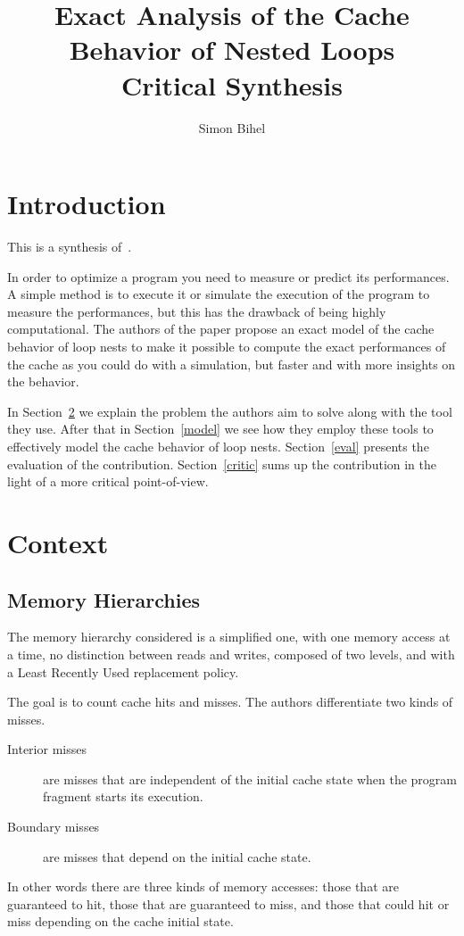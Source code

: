\documentclass{article}
\title{Exact Analysis of the Cache Behavior of Nested Loops\\
        \large Critical Synthesis}
\author{Simon Bihel}
\begin{document}
\maketitle

\section{Introduction}
This is a synthesis of~\cite{chatterjee2001exact}.

In order to optimize a program you need to measure or predict its performances.
A simple method is to execute it or simulate the execution of the program to measure the performances, but this has the drawback of being highly computational.
The authors of the paper propose an exact model of the cache behavior of loop nests to make it possible to compute the exact performances of the cache as you could do with a simulation, but faster and with more insights on the behavior.

In Section~\ref{context} we explain the problem the authors aim to solve along with the tool they use.
After that in Section~\ref{model} we see how they employ these tools to effectively model the cache behavior of loop nests.
Section~\ref{eval} presents the evaluation of the contribution.
Section~\ref{critic} sums up the contribution in the light of a more critical point-of-view.

\section{Context}
\label{context}

\subsection{Memory Hierarchies}
The memory hierarchy considered is a simplified one, with one memory access at a time, no distinction between reads and writes, composed of two levels, and with a Least Recently Used replacement policy.

The goal is to count cache hits and misses.
The authors differentiate two kinds of misses.
\begin{description}
        \item[Interior misses] are misses that are independent of the initial cache state when the program fragment starts its execution.
        \item[Boundary misses] are misses that depend on the initial cache state.
\end{description}
In other words there are three kinds of memory accesses: those that are guaranteed to hit, those that are guaranteed to miss, and those that could hit or miss depending on the cache initial state.
\end{document}
